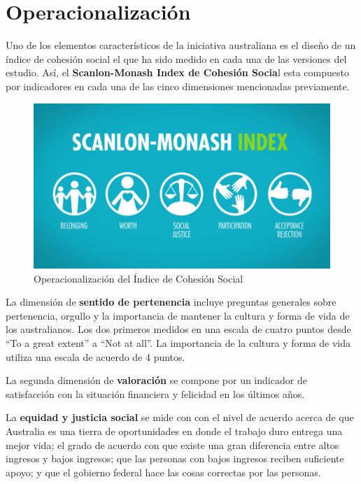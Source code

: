 \documentclass[
  12pt,
]{book}
\begin{document}
\hypertarget{operacionalizaciuxf3n}{%
\section{Operacionalización}\label{operacionalizaciuxf3n}}

Uno de los elementos característicos de la iniciativa australiana es el diseño de un índice de cohesión social el que ha sido medido en cada una de las versiones del estudio. Así, el \textbf{Scanlon-Monash Index de Cohesión Socia}l esta compuesto por indicadores en cada una de las cinco dimensiones mencionadas previamente.

\begin{figure}[H]

{\centering \includegraphics[width=0.75\linewidth]{inputs/images/scalon} 

}

\caption{Operacionalización del Índice de Cohesión Social}\label{fig:scalon}
\end{figure}

La dimensión de \textbf{sentido de pertenencia} incluye preguntas generales sobre pertenencia, orgullo y la importancia de mantener la cultura y forma de vida de los australianos. Los dos primeros medidos en una escala de cuatro puntos desde ``To a great extent'' a ``Not at all''. La importancia de la cultura y forma de vida utiliza una escala de acuerdo de 4 puntos.

La segunda dimensión de \textbf{valoración} se compone por un indicador de satisfacción con la situación financiera y felicidad en los últimos años.

La \textbf{equidad y justicia social} se mide con con el nivel de acuerdo acerca de que Australia es una tierra de oportunidades en donde el trabajo duro entrega una mejor vida; el grado de acuerdo con que existe una gran diferencia entre altos ingresos y bajos ingresos; que las personas con bajos ingresos reciben suficiente apoyo; y que el gobierno federal hace las cosas correctas por las personas.
\end{document}
